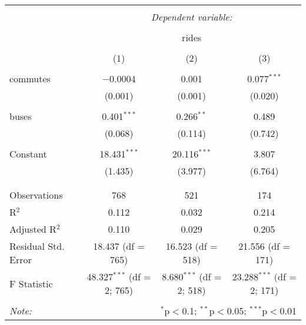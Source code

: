 
\begin{table}[!htbp] \centering 
  \caption{} 
  \label{} 
\begin{tabular}{@{\extracolsep{5pt}}lccc} 
\\[-1.8ex]\hline 
\hline \\[-1.8ex] 
 & \multicolumn{3}{c}{\textit{Dependent variable:}} \\ 
\cline{2-4} 
\\[-1.8ex] & \multicolumn{3}{c}{rides} \\ 
\\[-1.8ex] & (1) & (2) & (3)\\ 
\hline \\[-1.8ex] 
 commutes & $-$0.0004 & 0.001 & 0.077$^{***}$ \\ 
  & (0.001) & (0.001) & (0.020) \\ 
  & & & \\ 
 buses & 0.401$^{***}$ & 0.266$^{**}$ & 0.489 \\ 
  & (0.068) & (0.114) & (0.742) \\ 
  & & & \\ 
 Constant & 18.431$^{***}$ & 20.116$^{***}$ & 3.807 \\ 
  & (1.435) & (3.977) & (6.764) \\ 
  & & & \\ 
\hline \\[-1.8ex] 
Observations & 768 & 521 & 174 \\ 
R$^{2}$ & 0.112 & 0.032 & 0.214 \\ 
Adjusted R$^{2}$ & 0.110 & 0.029 & 0.205 \\ 
Residual Std. Error & 18.437 (df = 765) & 16.523 (df = 518) & 21.556 (df = 171) \\ 
F Statistic & 48.327$^{***}$ (df = 2; 765) & 8.680$^{***}$ (df = 2; 518) & 23.288$^{***}$ (df = 2; 171) \\ 
\hline 
\hline \\[-1.8ex] 
\textit{Note:}  & \multicolumn{3}{r}{$^{*}$p$<$0.1; $^{**}$p$<$0.05; $^{***}$p$<$0.01} \\ 
\end{tabular} 
\end{table} 
